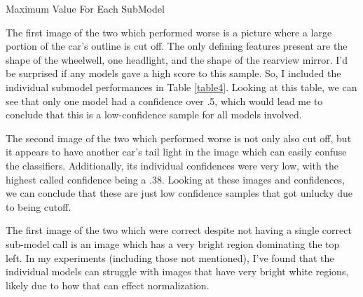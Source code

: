 \documentclass[12pt]{article}
\begin{document}
\begin{table}
  \resizebox*{.95\textwidth}{!}{}
  \caption{Maximum Value For Each SubModel}
  \label{table4}
\end{table}





The first image of the two which performed worse is a picture where a large portion of the car's outline is 
cut off. The only defining features present are the shape of the wheelwell, one headlight, and the shape of 
the rearview mirror. I'd be surprised if any models gave a high score to this sample. So, I included the individual 
submodel performances in Table \ref{table4}. Looking at this table, we can see that only one model had a confidence 
over .5, which would lead me to conclude that this is a low-confidence sample for all models involved.

The second image of the two which performed worse is not only also cut off, but it appears to have another 
car's tail light in the image which can easily confuse the classifiers. Additionally, its individual confidences 
were very low, with the highest called confidence being a .38. Looking at these images and confidences, we can conclude 
that these are just low confidence samples that got unlucky due to being cutoff. 

The first image of the two which were correct despite not having a single correct sub-model call is an image which 
has a very bright region dominating the top left. In my experiments (including those not mentioned), I've found that 
the individual models can struggle with images that have very bright white regions, likely due to how that can 
effect normalization. 
\end{document}

